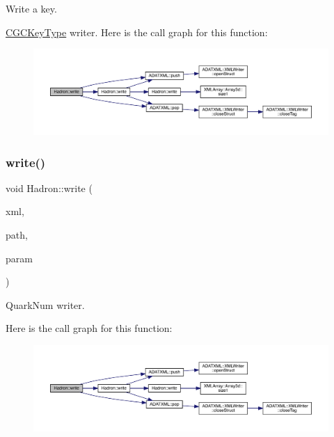 Write a key. 

\mbox{\hyperlink{structHadron_1_1CGCKeyType}{C\+G\+C\+Key\+Type}} writer. Here is the call graph for this function\+:
\nopagebreak
\begin{figure}[H]
\begin{center}
\leavevmode
\includegraphics[width=350pt]{d1/daf/namespaceHadron_a1df6238e1c6eca70a3e05655f2680904_cgraph}
\end{center}
\end{figure}
\mbox{\label{namespaceHadron_a7da51caa70247c9ab9d11f8275ec93b7}} 
\subsubsection{\texorpdfstring{write()}{write()}\hspace{0.1cm}{\footnotesize\ttfamily [5/95]}}
{\footnotesize\ttfamily void Hadron\+::write (\begin{DoxyParamCaption}\item[{\mbox{\hyperlink{classADATXML_1_1XMLWriter}{X\+M\+L\+Writer}} \&}]{xml,  }\item[{const std\+::string \&}]{path,  }\item[{const \mbox{\hyperlink{structHadron_1_1QuarkNum__t}{Quark\+Num\+\_\+t}} \&}]{param }\end{DoxyParamCaption})}



Quark\+Num writer. 

Here is the call graph for this function\+:
\nopagebreak
\begin{figure}[H]
\begin{center}
\leavevmode
\includegraphics[width=350pt]{d1/daf/namespaceHadron_a7da51caa70247c9ab9d11f8275ec93b7_cgraph}
\end{center}
\end{figure}
\mbox{\label{namespaceHadron_a2454ead756c8c4f2b1f75bbf8d3c1070}} 
